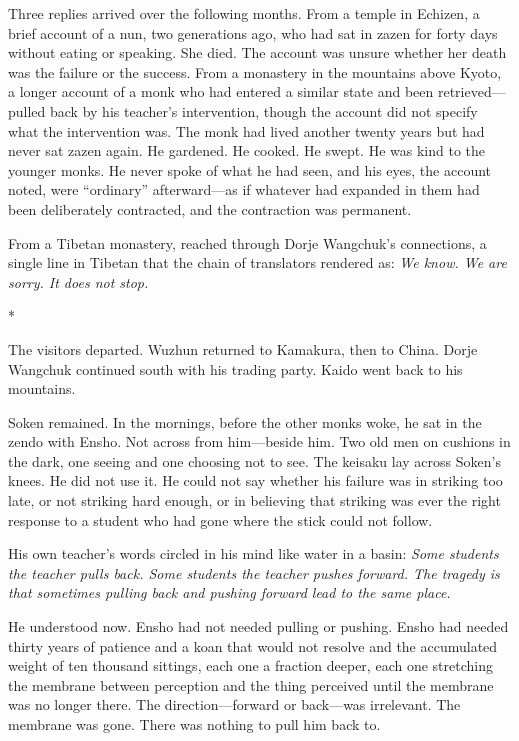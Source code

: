Three replies arrived over the following months. From a temple in Echizen, a brief account of a nun, two generations ago, who had sat in zazen for forty days without eating or speaking. She died. The account was unsure whether her death was the failure or the success. From a monastery in the mountains above Kyoto, a longer account of a monk who had entered a similar state and been retrieved---pulled back by his teacher's intervention, though the account did not specify what the intervention was. The monk had lived another twenty years but had never sat zazen again. He gardened. He cooked. He swept. He was kind to the younger monks. He never spoke of what he had seen, and his eyes, the account noted, were ``ordinary'' afterward---as if whatever had expanded in them had been deliberately contracted, and the contraction was permanent.

From a Tibetan monastery, reached through Dorje Wangchuk's connections, a single line in Tibetan that the chain of translators rendered as: \emph{We know. We are sorry. It does not stop.}

\begin{center}
*\quad*\quad*
\end{center}

The visitors departed. Wuzhun returned to Kamakura, then to China. Dorje Wangchuk continued south with his trading party. Kaido went back to his mountains.

Soken remained. In the mornings, before the other monks woke, he sat in the zendo with Ensho. Not across from him---beside him. Two old men on cushions in the dark, one seeing and one choosing not to see. The keisaku lay across Soken's knees. He did not use it. He could not say whether his failure was in striking too late, or not striking hard enough, or in believing that striking was ever the right response to a student who had gone where the stick could not follow.

His own teacher's words circled in his mind like water in a basin: \emph{Some students the teacher pulls back. Some students the teacher pushes forward. The tragedy is that sometimes pulling back and pushing forward lead to the same place.}

He understood now. Ensho had not needed pulling or pushing. Ensho had needed thirty years of patience and a koan that would not resolve and the accumulated weight of ten thousand sittings, each one a fraction deeper, each one stretching the membrane between perception and the thing perceived until the membrane was no longer there. The direction---forward or back---was irrelevant. The membrane was gone. There was nothing to pull him back to.

